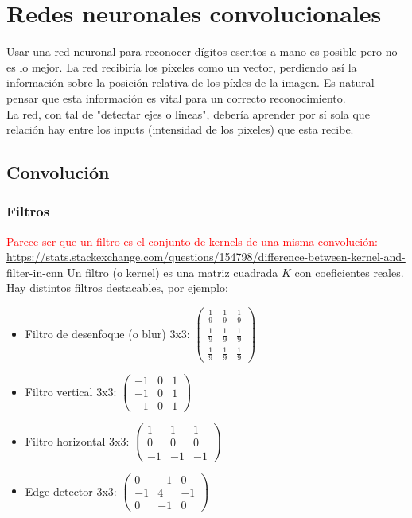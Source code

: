 \documentclass{article}
\begin{document}
\section{Redes neuronales convolucionales}

Usar una red neuronal para reconocer dígitos escritos a mano es posible pero no es lo mejor. La red recibiría los píxeles como un vector, perdiendo así la información sobre la posición relativa de los píxles de la imagen. Es natural pensar que esta información es vital para un correcto reconocimiento.\\

La red, con tal de "detectar ejes o lineas", debería aprender por sí sola que relación hay entre los inputs (intensidad de los pixeles) que esta recibe.\\

\subsection{Convolución}

\subsubsection{Filtros}
\textcolor{red}{Parece ser que un filtro es el conjunto de kernels de una misma convolución: \url{https://stats.stackexchange.com/questions/154798/difference-between-kernel-and-filter-in-cnn}}
Un filtro (o kernel) es una matriz cuadrada $K$ con coeficientes reales. Hay distintos filtros destacables, por ejemplo:
\begin{itemize}
\item Filtro de desenfoque (o blur) 3x3: $\begin{pmatrix}
\frac{1}{9} & \frac{1}{9} & \frac{1}{9}\\
\frac{1}{9} & \frac{1}{9} & \frac{1}{9}\\
\frac{1}{9} & \frac{1}{9} & \frac{1}{9}
\end{pmatrix}$

\item Filtro vertical 3x3: $\begin{pmatrix}
-1 & 0 & 1\\
-1 & 0 & 1\\
-1 & 0 & 1
\end{pmatrix}$

\item Filtro horizontal 3x3: $\begin{pmatrix}
1 & 1 & 1\\
0 & 0 & 0\\
-1 & -1 & -1
\end{pmatrix}$

\item Edge detector 3x3: $\begin{pmatrix}
0 & -1 & 0\\
-1 & 4 & -1\\
0 & -1 & 0
\end{pmatrix}$


\end{itemize}
\end{document}
